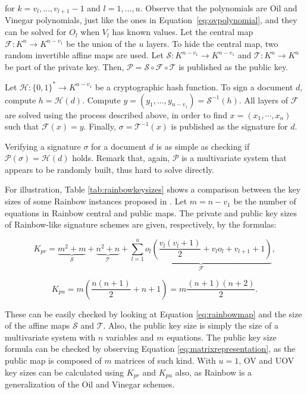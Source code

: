 \documentclass{ufsctex/ufsctex}
\begin{document}
\noindent
for $k = v_l, \dots, v_{l+1} - 1$ and $l = 1, \dots, u$. Observe that the
polynomials are Oil and Vinegar polynomials, just like the ones in
Equation~\ref{eq:ovpolynomial}, and they can be solved for $O_l$ when $V_l$ has
known values. Let the central map $\mathcal{F}:K^{n} \to K^{n-v_1}$ be the
union of the $u$ layers. To hide the central map, two random invertible affine
maps are used. Let $\mathcal{S}:K^{n-v_1} \to K^{n-v_1}$ and $\mathcal{T}:K^{n}
\to K^{n}$ be part of the private key. Then, $\mathcal{P} = \mathcal{S} \circ
\mathcal{F} \circ \mathcal{T}$ is published as the public key.

Let $\mathcal{H}: \{0,1\}^* \to K^{n-v_1}$ be a cryptographic hash function. To
sign a document $d$, compute $h = \mathcal{H}(d)$. Compute $y = (y_1, \dots,
y_{n-v_1}) = \mathcal{S}^{-1}(h)$. All layers of $\mathcal{F}$ are solved using
the process described above, in order to find $x = (x_1, \cdots, x_n)$ such
that $\mathcal{F}(x) = y$. Finally, $\sigma = \mathcal{T}^{-1}(x)$ is published
as the signature for $d$.

Verifying a signature $\sigma$ for a document $d$ is as simple as checking if
$\mathcal{P}(\sigma) = \mathcal{H}(d)$ holds. Remark that, again, $\mathcal{P}$
is a multivariate system that appears to be randomly built, thus hard to solve
directly.

For illustration, Table \ref{tab:rainbowkeysizes} shows a comparison between
the key sizes of some Rainbow instances proposed in \cite[Chapter
6]{petzoldt2013thesis}. Let $m = n - v_1$ be the number of equations in Rainbow
central and public maps. The private and public key sizes of Rainbow-like
signature schemes are given, respectively, by the formulas:

\begin{equation}\label{eq:rainbowprivatekeysize}
K_{pr} =
\underbrace{m^2 + m}_{\mathcal{S}} + \underbrace{n^2 + n}_{\mathcal{T}} +
\underbrace{\sum_{l=1}^{u} o_l \left(
\frac{v_l(v_l + 1)}{2} + v_l o_l + v_{l+1} + 1
\right)}_{\mathcal{F}},
\end{equation}

\begin{equation}
K_{pu} = m \left( \frac{n (n + 1)}{2} + n + 1 \right)
= m \frac{(n+1)(n+2)}{2}.
\end{equation}

These can be easily checked by looking at Equation \ref{eq:rainbowmap} and the
size of the affine maps $\mathcal{S}$ and $\mathcal{T}$. Also, the public key
size is simply the size of a multivariate system with $n$ variables and $m$
equations. The public key size formula can be checked by observing Equation
\ref{eq:matrixrepresentation}, as the public map is composed of $m$ matrices of
such kind. With $u=1$, OV and UOV key sizes can be calculated using $K_{pr}$
and $K_{pu}$ also, as Rainbow is a generalization of the Oil and Vinegar
schemes.
\end{document}
